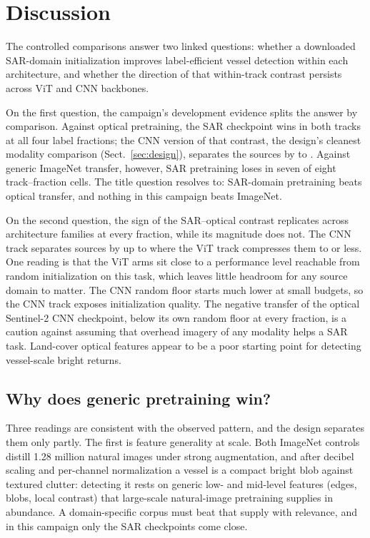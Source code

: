 \section{Discussion}
\label{sec:discussion}

The controlled comparisons answer two linked questions: whether a downloaded
SAR-domain initialization improves label-efficient vessel detection within
each architecture, and whether the direction of that within-track contrast
persists across ViT and CNN backbones.

On the first question, the campaign's development evidence splits the answer
by comparison. Against optical pretraining, the SAR checkpoint wins in both
tracks at all four label fractions; the CNN version of that contrast, the
design's cleanest modality comparison (Sect.~\ref{sec:design}), separates
the sources by \SarOptCnnHundredAbs{} to \SarOptCnnTwentyFiveAbs. Against
generic ImageNet transfer, however, SAR pretraining loses in seven of eight
track--fraction cells. The title question resolves to: SAR-domain
pretraining beats optical transfer, and nothing in this campaign beats
ImageNet.

On the second question, the sign of the SAR--optical contrast replicates
across architecture families at every fraction, while its magnitude does
not. The CNN track separates sources by up to \SarOptCnnTwentyFiveAbs{}
where the ViT track compresses them to \SarOptVitMaxAbs{} or less. One
reading is that the ViT arms sit close to a performance level reachable from
random initialization on this task, which leaves little headroom for any
source domain to matter. The CNN random floor starts much lower at small
budgets, so the CNN track exposes initialization quality. The negative
transfer of the optical Sentinel-2 CNN checkpoint, below its own random
floor at every fraction, is a caution against assuming that overhead imagery
of any modality helps a SAR task. Land-cover optical features appear to be a
poor starting point for detecting vessel-scale bright returns.

\subsection{Why does generic pretraining win?}
\label{sec:mechanisms}

Three readings are consistent with the observed pattern, and the design
separates them only partly. The first is feature generality at scale. Both
ImageNet controls distill 1.28 million natural images under strong
augmentation, and after decibel scaling and per-channel normalization a
vessel is a compact bright blob against textured clutter: detecting it
rests on generic low- and mid-level features (edges, blobs, local contrast)
that large-scale natural-image pretraining supplies in abundance. A
domain-specific corpus must beat that supply with relevance, and in this
campaign only the SAR checkpoints come close.

